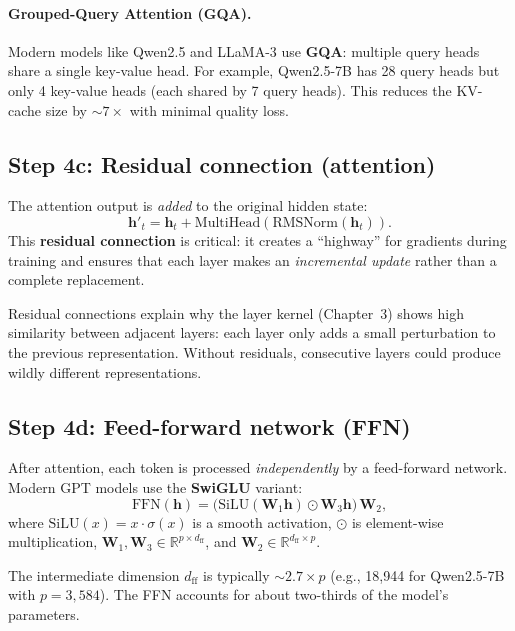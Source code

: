 \documentclass[11pt, twoside, openright]{memoir}
\begin{document}
\paragraph{Grouped-Query Attention (GQA).}  Modern models like Qwen2.5
and LLaMA-3 use \textbf{GQA}: multiple query heads share a single key-value
head.  For example, Qwen2.5-7B has 28 query heads but only 4 key-value
heads (each shared by 7 query heads).  This reduces the KV-cache size by
$\sim 7\times$ with minimal quality loss.

\subsection{Step 4c: Residual connection (attention)}

The attention output is \emph{added} to the original hidden state:
\[
  \mathbf{h}'_t = \mathbf{h}_t + \text{MultiHead}(\text{RMSNorm}(\mathbf{h}_t)).
\]
This \textbf{residual connection} is critical: it creates a ``highway'' for
gradients during training and ensures that each layer makes an
\emph{incremental update} rather than a complete replacement.

\begin{keyidea}
Residual connections explain why the layer kernel (Chapter~3) shows high
similarity between adjacent layers: each layer only adds a small perturbation
to the previous representation.  Without residuals, consecutive layers
could produce wildly different representations.
\end{keyidea}

\subsection{Step 4d: Feed-forward network (FFN)}

After attention, each token is processed \emph{independently} by a
feed-forward network.  Modern GPT models use the \textbf{SwiGLU} variant:
\[
  \text{FFN}(\mathbf{h}) =
  \bigl(\text{SiLU}(\mathbf{W}_1 \mathbf{h}) \odot \mathbf{W}_3 \mathbf{h}\bigr)
  \, \mathbf{W}_2,
\]
where $\text{SiLU}(x) = x \cdot \sigma(x)$ is a smooth activation,
$\odot$ is element-wise multiplication,
$\mathbf{W}_1, \mathbf{W}_3 \in \mathbb{R}^{p \times d_{\text{ff}}}$, and
$\mathbf{W}_2 \in \mathbb{R}^{d_{\text{ff}} \times p}$.

The intermediate dimension $d_{\text{ff}}$ is typically $\sim 2.7 \times p$
(e.g., 18{,}944 for Qwen2.5-7B with $p = 3{,}584$).  The FFN accounts for
about two-thirds of the model's parameters.
\end{document}
